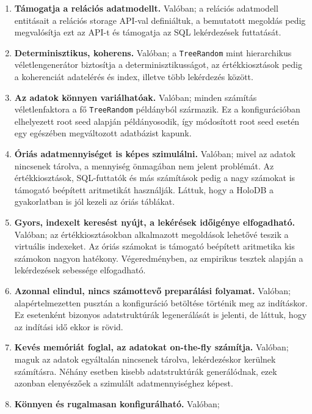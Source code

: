 \documentclass[
    parspace,
    noindent,
    nohyp,
]{elteiktdk}[2023/04/10]
\begin{document}
\begin{enumerate}
    \setlength\itemsep{-0.5em}
    \item \textbf{Támogatja a relációs adatmodellt.} Valóban;
          a relációs adatmodell entitásait a relációs storage API-val definiáltuk,
          a bemutatott megoldás pedig megvalósítja ezt az API-t és
          támogatja az SQL lekérdezések futtatását.
    \item \textbf{Determinisztikus, koherens.} Valóban;
          a \texttt{TreeRandom} mint hierarchikus véletlengenerátor
          biztosítja a determinisztikusságot,
          az értékkiosztások pedig a koherenciát adatelérés és index,
          illetve több lekérdezés között.
    \item \textbf{Az adatok könnyen variálhatóak.} Valóban;
          minden számítás véletlenfaktora a fő \texttt{TreeRandom} példányból származik.
          Ez a konfigurációban elhelyezett root seed alapján példányosodik,
          így módosított root seed esetén egy egészében megváltozott adatbázist kapunk.
    \item \textbf{Óriás adatmennyiséget is képes szimulálni.} Valóban;
          mivel az adatok nincsenek tárolva, a mennyiség önmagában nem jelent problémát.
          Az értékkiosztások, SQL-futtatók és más számítások pedig
          a nagy számokat is támogató beépített aritmetikát használják.
          Láttuk, hogy a HoloDB a gyakorlatban is jól kezeli az óriás táblákat.
    \item \textbf{Gyors, indexelt keresést nyújt, a lekérések időigénye elfogadható.} Valóban;
          az értékkiosztásokban alkalmazott megoldások lehetővé teszik a virtuális indexeket.
          Az óriás számokat is támogató beépített aritmetika kis számokon nagyon hatékony.
          Végeredményben, az empirikus tesztek alapján a lekérdezések sebessége elfogadható.
    \item \textbf{Azonnal elindul, nincs számottevő preparálási folyamat.} Valóban;
          alapértelmezetten pusztán a konfiguráció betöltése történik meg az indításkor.
          Ez esetenként bizonyos adatstruktúrák legenerálását is jelenti,
          de láttuk, hogy az indítási idő ekkor is rövid.
    \item \textbf{Kevés memóriát foglal, az adatokat on-the-fly számítja.} Valóban;
          maguk az adatok egyáltalán nincsenek tárolva, lekérdezéskor kerülnek számításra.
          Néhány esetben kisebb adatstruktúrák generálódnak,
          ezek azonban elenyészőek a szimulált adatmennyiséghez képest.
    \item \textbf{Könnyen és rugalmasan konfigurálható.} Valóban;

\end{enumerate}
\end{document}
